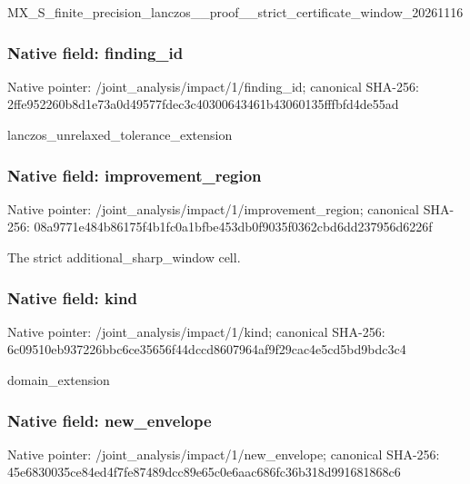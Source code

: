 \documentclass[10pt,a4paper]{article}
\begin{document}
\begingroup\raggedright\sloppy MX\_\allowbreak{}S\_\allowbreak{}finite\_\allowbreak{}precision\_\allowbreak{}lanczos\_\allowbreak{}\_\allowbreak{}proof\_\allowbreak{}\_\allowbreak{}strict\_\allowbreak{}certificate\_\allowbreak{}window\_\allowbreak{}20261116\par\endgroup

\subsubsection{Native field: finding\_\allowbreak{}id}
Native pointer: /joint\_\allowbreak{}analysis/impact/1/finding\_\allowbreak{}id; canonical SHA-256: 2ffe952260b8d1e73a0d49577fdec3c40300643461b43060135fffbfd4de55ad

\begingroup\raggedright\sloppy lanczos\_\allowbreak{}unrelaxed\_\allowbreak{}tolerance\_\allowbreak{}extension\par\endgroup

\subsubsection{Native field: improvement\_\allowbreak{}region}
Native pointer: /joint\_\allowbreak{}analysis/impact/1/improvement\_\allowbreak{}region; canonical SHA-256: 08a9771e484b86175f4b1fc0a1bfbe453db0f9035f0362cbd6dd237956d6226f

\begingroup\raggedright\sloppy The strict additional\_\allowbreak{}sharp\_\allowbreak{}window cell.\par\endgroup

\subsubsection{Native field: kind}
Native pointer: /joint\_\allowbreak{}analysis/impact/1/kind; canonical SHA-256: 6c09510eb937226bbc6ce35656f44dccd8607964af9f29cac4e5cd5bd9bdc3c4

\begingroup\raggedright\sloppy domain\_\allowbreak{}extension\par\endgroup

\subsubsection{Native field: new\_\allowbreak{}envelope}
Native pointer: /joint\_\allowbreak{}analysis/impact/1/new\_\allowbreak{}envelope; canonical SHA-256: 45e6830035ce84ed4f7fe87489dcc89e65c0e6aac686fc36b318d991681868c6
\end{document}
